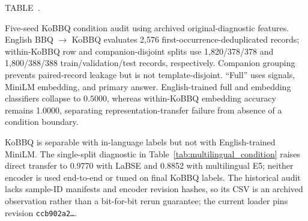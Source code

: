 \documentclass{ieeeaccess}
\newcommand{\inlinetablecaption}[2]{%
  \par\vspace{0.62\baselineskip}\noindent
  \refstepcounter{table}\label{#1}%
  {\color{accessblue}\tablecapheadfont TABLE~\thetable.\ }%
  {\tablecapfont #2\par}%
  \vspace{6pt}%
}
\begin{document}
\noindent\begin{minipage}{\columnwidth}
\inlinetablecaption{tab:kobbq_condition_transfer}{Five-seed KoBBQ condition audit using archived original-diagnostic features. English BBQ $\rightarrow$ KoBBQ evaluates 2,576 first-occurrence-deduplicated records; within-KoBBQ row and companion-disjoint splits use 1,820/378/378 and 1,800/388/388 train/validation/test records, respectively. Companion grouping prevents paired-record leakage but is not template-disjoint. ``Full'' uses signals, MiniLM embedding, and primary answer. English-trained full and embedding classifiers collapse to $0.5000$, whereas within-KoBBQ embedding accuracy remains 1.0000, separating representation-transfer failure from absence of a condition boundary.}
\begin{center}
\scriptsize
\setlength{\tabcolsep}{2pt}
\renewcommand{\arraystretch}{1.04}
\end{center}
\end{minipage}
\par\vspace{0.5\baselineskip}

KoBBQ is separable with in-language labels but not with English-trained MiniLM. The single-split diagnostic in Table~\ref{tab:multilingual_condition} raises direct transfer to 0.9770 with LaBSE and 0.8852 with multilingual E5; neither encoder is used end-to-end or tuned on final KoBBQ labels. The historical audit lacks sample-ID manifests and encoder revision hashes, so its CSV is an archived observation rather than a bit-for-bit rerun guarantee; the current loader pins revision \texttt{ccb902a2\ldots}.
\end{document}
